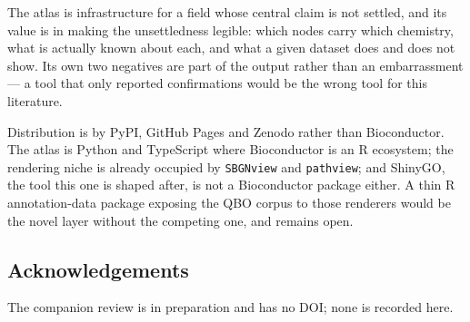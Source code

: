 \documentclass[11pt,a4paper]{article}
\begin{document}
The atlas is infrastructure for a field whose central claim is not settled, and its value
is in making the unsettledness legible: which nodes carry which chemistry, what is
actually known about each, and what a given dataset does and does not show. Its own two
negatives are part of the output rather than an embarrassment --- a tool that only
reported confirmations would be the wrong tool for this literature.

Distribution is by PyPI, GitHub Pages and Zenodo rather than Bioconductor. The atlas is
Python and TypeScript where Bioconductor is an R ecosystem; the rendering niche is
already occupied by \texttt{SBGNview} and \texttt{pathview}; and ShinyGO, the tool this
one is shaped after, is not a Bioconductor package either. A thin R annotation-data
package exposing the QBO corpus to those renderers would be the novel layer without the
competing one, and remains open.

\subsection*{Acknowledgements}
The companion review \citep{PorterfieldBarker} is in preparation and has no DOI; none is
recorded here.


\end{document}
